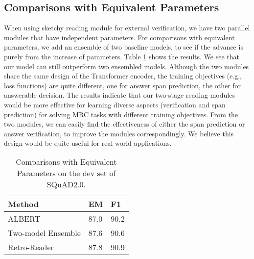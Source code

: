 \documentclass[letterpaper]{article} \usepackage{aaai21}  \usepackage{times}  \usepackage{helvet} \usepackage{courier}  \usepackage[hyphens]{url}  \usepackage{graphicx}
\begin{document}
\subsection{Comparisons with Equivalent Parameters}
When using sketchy reading module for external verification, we have two parallel modules that have independent parameters. For comparisons with equivalent parameters, we add an ensemble of two baseline models, to see if the advance is purely from the increase of parameters. Table \ref{tableequ} shows the results. We see that our model can still outperform two ensembled models. Although the two modules share the same design of the Transformer encoder, the training objectives (e.g., loss functions) are quite different, one for answer span prediction, the other for answerable decision. The results indicate that our two-stage reading modules would be more effective for learning diverse aspects (verification and span prediction) for solving MRC tasks with different training objectives. From the two modules, we can easily find the effectiveness of either the span prediction or answer verification, to improve the modules correspondingly. We believe this design would be quite useful for real-world applications.

\begin{table}
	\begin{center}
\setlength{\tabcolsep}{13.5pt}
		{
			\begin{tabular}{lll}
				\toprule
				\textbf{Method}	& \textbf{EM} & \textbf{F1} \\
				\midrule
				ALBERT & 87.0 & 90.2  \\
				Two-model Ensemble & 87.6  &  90.6    \\
				Retro-Reader  &  87.8 & 90.9  \\
				\bottomrule
			\end{tabular}
		}
	\end{center}
	\caption{\label{tableequ} Comparisons with Equivalent Parameters on the dev set of SQuAD2.0.}
\end{table}
\end{document}
